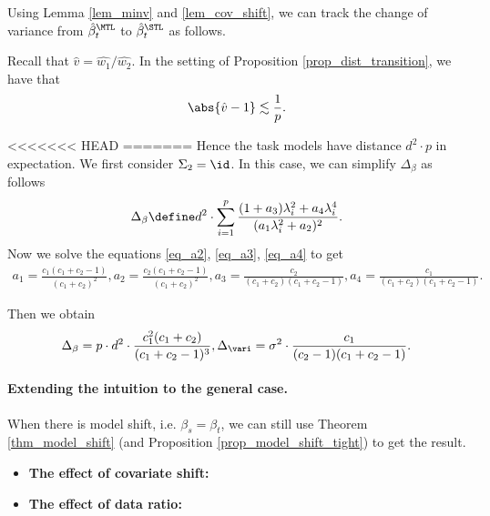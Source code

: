Using Lemma \ref{lem_minv} and \ref{lem_cov_shift}, we can track the change of variance from $\hat{\beta}_t^{\MTL}$ to $\hat{\beta}_t^{\STL}$ as follows.

\begin{lemma}\label{lem_hat_v}
	Recall that $\hat{v} = \hat{w_1} / \hat{w_2}$.
	In the setting of Proposition \ref{prop_dist_transition}, we have that
	\[ \abs{\hat{v} - 1} \lesssim \frac 1 p. \]
\end{lemma}

<<<<<<< HEAD
=======
Hence the task models have distance $d^2\cdot p$ in expectation.
	We first consider $\Sigma_2 = \id$. In this case, we can simplify $\Delta_{\beta}$ as follows
	\begin{align} \label{eq_delta_simple}
		\Delta_{\beta} \define d^2 \cdot \sum_{i=1}^p \frac{(1 + a_3)\lambda_i^2 + a_4 \lambda_i^4}{(a_1 \lambda_i^2 + a_2)^2}.
	\end{align}
	Now we solve the equations \eqref{eq_a2}, \eqref{eq_a3}, \eqref{eq_a4} to get
	\begin{align}
		a_1 = \frac{c_1(c_1 + c_2 - 1)}{(c_1 + c_2)^2},
		a_2 = \frac{c_2(c_1 + c_2 - 1)}{(c_1 + c_2)^2},
		a_3 = \frac{c_2}{(c_1 + c_2)(c_1 + c_2 - 1)},
		a_4 = \frac{c_1}{(c_1 + c_2)(c_1 + c_2 - 1)}.
	\end{align}

	Then we obtain
	\begin{align}
		\Delta_{\beta} = p \cdot d^2 \cdot \frac{c_1^2 (c_1 + c_2)}{(c_1 + c_2 - 1)^3},
		\Delta_{\vari} = \sigma^2 \cdot \frac{c_1}{(c_2 - 1)(c_1 + c_2 - 1)}.
	\end{align}



\paragraph{Extending the intuition to the general case.}
When there is model shift, i.e. $\beta_s = \beta_t$, we can still use Theorem \ref{thm_model_shift} (and Proposition \ref{prop_model_shift_tight}) to get the result.
\begin{itemize}
	\item \textbf{The effect of covariate shift:}
	\item \textbf{The effect of data ratio:}
\end{itemize}


